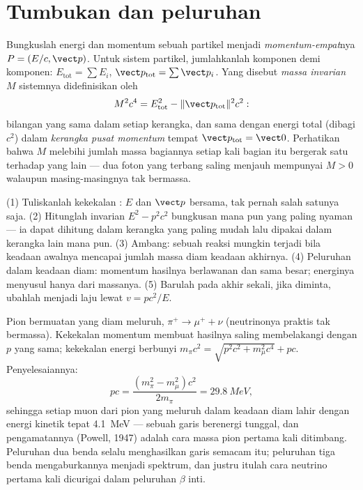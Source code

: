 \section{Tumbukan dan peluruhan}

\begin{definition}\label{def:b3:relativistic-dynamics:four-momentum}
Bungkuslah energi dan momentum sebuah partikel menjadi
\emph{momentum-empat}nya
$P = (E/c, \vect p)$. Untuk sistem partikel, jumlahkanlah komponen demi
komponen: $E_{\text{tot}} = \sum E_i$, $\vect p_{\text{tot}} = \sum\vect p_i$.
Yang disebut \emph{massa invarian} $M$ sistemnya didefinisikan oleh
\[
M^2c^4 = E_{\text{tot}}^2 - \|\vect p_{\text{tot}}\|^2c^2 :
\]
bilangan yang sama dalam setiap kerangka, dan sama dengan energi total
(dibagi $c^2$) dalam \emph{kerangka pusat momentum} tempat
$\vect p_{\text{tot}} = \vect 0$. Perhatikan bahwa $M$ melebihi jumlah
massa bagiannya setiap kali bagian itu bergerak satu terhadap yang lain
--- dua foton yang terbang saling menjauh mempunyai $M > 0$ walaupun
masing-masingnya tak bermassa.
\end{definition}

\begin{method}\label{met:b3:relativistic-dynamics:method}
(1) Tuliskanlah kekekalan : $E$ dan $\vect p$ bersama,
tak pernah salah satunya saja. (2) Hitunglah invarian $E^2 - p^2c^2$
bungkusan mana pun yang paling nyaman --- ia dapat dihitung dalam
kerangka yang paling mudah lalu dipakai dalam kerangka lain mana pun.
(3) Ambang: sebuah reaksi mungkin terjadi bila  keadaan
awalnya mencapai jumlah massa diam keadaan akhirnya. (4) Peluruhan
dalam keadaan diam: momentum hasilnya berlawanan dan sama besar;
energinya menyusul hanya dari massanya. (5) Barulah pada akhir sekali,
jika diminta, ubahlah menjadi laju lewat $v = pc^2/E$.
\end{method}

\begin{example}\label{ex:b3:relativistic-dynamics:pion}
Pion bermuatan yang diam meluruh, $\pi^+ \to \mu^+ + \nu$ (neutrinonya
praktis tak bermassa). Kekekalan momentum membuat hasilnya saling
membelakangi dengan $p$ yang sama; kekekalan energi berbunyi $m_\pi c^2 =
\sqrt{p^2c^2 + m_\mu^2c^4} + pc$. Penyelesaiannya:
\[
pc = \frac{(m_\pi^2 - m_\mu^2)c^2}{2m_\pi} = \qty{29.8}{MeV} ,
\]
sehingga setiap muon dari pion yang meluruh dalam keadaan diam lahir
dengan energi kinetik tepat \qty{4.1}{MeV} --- sebuah garis
berenergi tunggal, dan pengamatannya (Powell, 1947) adalah cara massa
pion pertama kali ditimbang. Peluruhan dua benda selalu menghasilkan
garis semacam itu; peluruhan tiga benda mengaburkannya menjadi
spektrum, dan justru itulah cara neutrino pertama kali dicurigai dalam
peluruhan $\beta$ inti.
\end{example}

